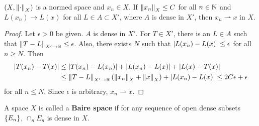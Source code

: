 \begin{proposition}
    $(X,\left\lVert {\cdot} \right\rVert_X)$ is a normed space and $x_n\in X$. If 
    $\left\lVert {x_n} \right\rVert_X\leq C$ for all $n\in\mathbb{N}$ and $L(x_n)\to L(x)$ 
    for all $L\in A\subset X'$, where $A$ is dense in $X'$, then 
    $x_n\rightharpoonup x$ in $X$.
\end{proposition}
\begin{proof}
    Let $\epsilon>0$ be given. $A$ is dense in $X'$. For $T\in X'$, 
    there is an $L\in A$ such that $\left\lVert {T-L} \right\rVert_{X'\to\mathbb{R}}\leq\epsilon$. 
    Also, there exists $N$ such that $\left\lvert {L(x_n)-L(x)} \right\rvert\leq\epsilon$ 
    for all $n\geq N$. Then
    \begin{equation*}
        \begin{split}
            \left\lvert {T(x_n) - T(x)} \right\rvert &\leq \left\lvert {T(x_n) - L(x_n)} \right\rvert + \left\lvert {L(x_n) - L(x)} \right\rvert + \left\lvert {L(x) - T(x)} \right\rvert \\
            &\leq \left\lVert {T-L} \right\rVert_{X'\to\mathbb{R}}(\left\lVert {x_n} \right\rVert_X + \left\lVert {x} \right\rVert_X) + \left\lvert {L(x_n) - L(x)} \right\rvert
            \leq 2C\epsilon + \epsilon
        \end{split}
    \end{equation*}
    for all $n\leq N$. Since $\epsilon$ is arbitrary, $x_n\rightharpoonup x$.
\end{proof}

\begin{definition}
    A space $X$ is called a \textbf{Baire space} if for any 
    sequence of open dense subsets $\left\{ {E_n} \right\}$, $\cap_n E_n$ 
    is dense in $X$.
\end{definition}

